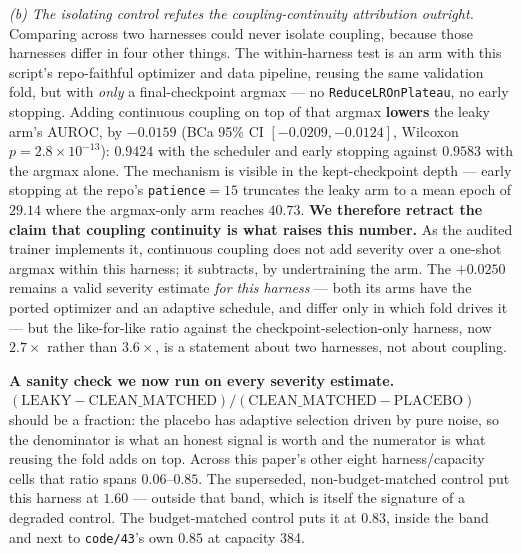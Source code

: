 \documentclass[10pt]{article} %
\begin{document}
\emph{(b) The isolating control refutes the coupling-continuity attribution
outright.} Comparing across two harnesses could never isolate coupling, because
those harnesses differ in four other things. The within-harness test is an arm
with this script's repo-faithful optimizer and data pipeline, reusing the same
validation fold, but with \emph{only} a final-checkpoint argmax --- no
\texttt{ReduceLROnPlateau}, no early stopping. Adding continuous coupling on top
of that argmax \textbf{lowers} the leaky arm's AUROC, by $-0.0159$ (BCa 95\% CI
$[-0.0209,-0.0124]$, Wilcoxon $p=2.8\times10^{-13}$): $0.9424$ with the
scheduler and early stopping against $0.9583$ with the argmax alone. The
mechanism is visible in the kept-checkpoint depth --- early stopping at the
repo's \texttt{patience}$=15$ truncates the leaky arm to a mean epoch of
$29.14$ where the argmax-only arm reaches $40.73$. \textbf{We therefore retract
the claim that coupling continuity is what raises this number.} As the audited
trainer implements it, continuous coupling does not add severity over a one-shot
argmax within this harness; it subtracts, by undertraining the arm. The
$+0.0250$ remains a valid severity estimate \emph{for this harness} --- both its
arms have the ported optimizer and an adaptive schedule, and differ only in
which fold drives it --- but the like-for-like ratio against the
checkpoint-selection-only harness, now $2.7\times$ rather than $3.6\times$, is a
statement about two harnesses, not about coupling.

\textbf{A sanity check we now run on every severity estimate.}
$(\text{LEAKY}-\text{CLEAN\_MATCHED})/(\text{CLEAN\_MATCHED}-\text{PLACEBO})$
should be a fraction: the placebo has adaptive selection driven by pure noise,
so the denominator is what an honest signal is worth and the numerator is what
reusing the fold adds on top. Across this paper's other eight harness/capacity
cells that ratio spans $0.06$--$0.85$. The superseded, non-budget-matched
control put this harness at $\mathbf{1.60}$ --- outside that band, which is
itself the signature of a degraded control. The budget-matched control puts it
at $\mathbf{0.83}$, inside the band and next to \texttt{code/43}'s own $0.85$ at
capacity 384.
\end{document}
